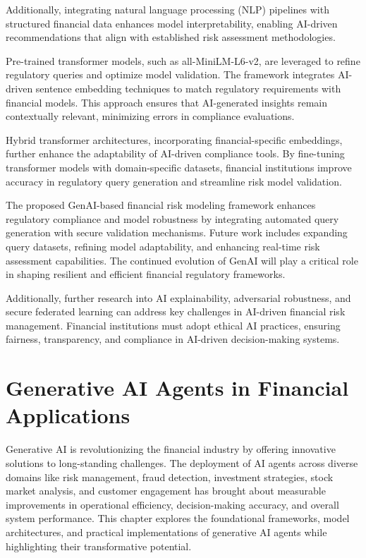 \documentclass[a4paper,headinclude=on,footinclude=on,12pt,oneside]{scrbook}
\begin{document}
	Additionally, integrating natural language processing (NLP) pipelines with structured financial data enhances model interpretability, enabling AI-driven recommendations that align with established risk assessment methodologies.
	
	Pre-trained transformer models, such as all-MiniLM-L6-v2, are leveraged to refine regulatory queries and optimize model validation. The framework integrates AI-driven sentence embedding techniques to match regulatory requirements with financial models. This approach ensures that AI-generated insights remain contextually relevant, minimizing errors in compliance evaluations.
	
	Hybrid transformer architectures, incorporating financial-specific embeddings, further enhance the adaptability of AI-driven compliance tools. By fine-tuning transformer models with domain-specific datasets, financial institutions improve accuracy in regulatory query generation and streamline risk model validation.
	
	The proposed GenAI-based financial risk modeling framework enhances regulatory compliance and model robustness by integrating automated query generation with secure validation mechanisms. Future work includes expanding query datasets, refining model adaptability, and enhancing real-time risk assessment capabilities. The continued evolution of GenAI will play a critical role in shaping resilient and efficient financial regulatory frameworks.
	
	Additionally, further research into AI explainability, adversarial robustness, and secure federated learning can address key challenges in AI-driven financial risk management. Financial institutions must adopt ethical AI practices, ensuring fairness, transparency, and compliance in AI-driven decision-making systems.
	
	
	
	\chapter{Generative AI Agents in Financial Applications}
	
	Generative AI is revolutionizing the financial industry by offering innovative solutions to long-standing challenges. The deployment of AI agents across diverse domains like risk management, fraud detection, investment strategies, stock market analysis, and customer engagement has brought about measurable improvements in operational efficiency, decision-making accuracy, and overall system performance. This chapter explores the foundational frameworks, model architectures, and practical implementations of generative AI agents while highlighting their transformative potential.
	
\end{document}
